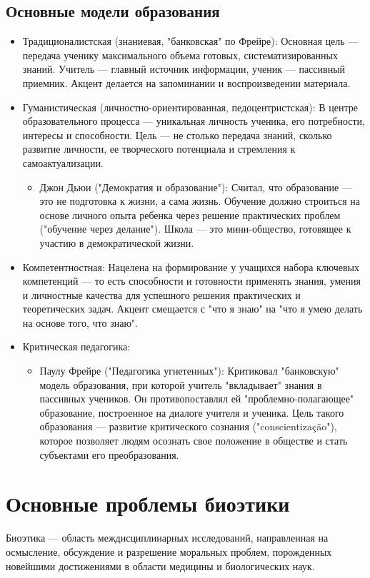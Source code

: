 \documentclass[12pt,a4paper]{article}
\begin{document}
	\subsection{Основные модели образования}
	\begin{itemize}
		\item Традиционалистская (знаниевая, "банковская" по Фрейре): Основная цель --- передача ученику максимального объема готовых, систематизированных знаний. Учитель --- главный источник информации, ученик --- пассивный приемник. Акцент делается на запоминании и воспроизведении материала.
		\item Гуманистическая (личностно-ориентированная, педоцентристская): В центре образовательного процесса --- уникальная личность ученика, его потребности, интересы и способности. Цель --- не столько передача знаний, сколько развитие личности, ее творческого потенциала и стремления к самоактуализации.
		\begin{itemize}
			\item Джон Дьюи ("Демократия и образование"): Считал, что образование --- это не подготовка к жизни, а сама жизнь. Обучение должно строиться на основе личного опыта ребенка через решение практических проблем ("обучение через делание"). Школа --- это мини-общество, готовящее к участию в демократической жизни.
		\end{itemize}
		\item Компетентностная: Нацелена на формирование у учащихся набора ключевых компетенций --- то есть способности и готовности применять знания, умения и личностные качества для успешного решения практических и теоретических задач. Акцент смещается с "что я знаю" на "что я умею делать на основе того, что знаю".
		\item Критическая педагогика:
		\begin{itemize}
			\item Паулу Фрейре ("Педагогика угнетенных"): Критиковал "банковскую" модель образования, при которой учитель "вкладывает" знания в пассивных учеников. Он противопоставлял ей "проблемно-полагающее" образование, построенное на диалоге учителя и ученика. Цель такого образования --- развитие критического сознания ("conscientização"), которое позволяет людям осознать свое положение в обществе и стать субъектами его преобразования.
		\end{itemize}
	\end{itemize}
	
	
	\section{Основные проблемы биоэтики~\checkmark}
	Биоэтика --- область междисциплинарных исследований, направленная на осмысление, обсуждение и разрешение моральных проблем, порожденных новейшими достижениями в области медицины и биологических наук.
	
\end{document}
